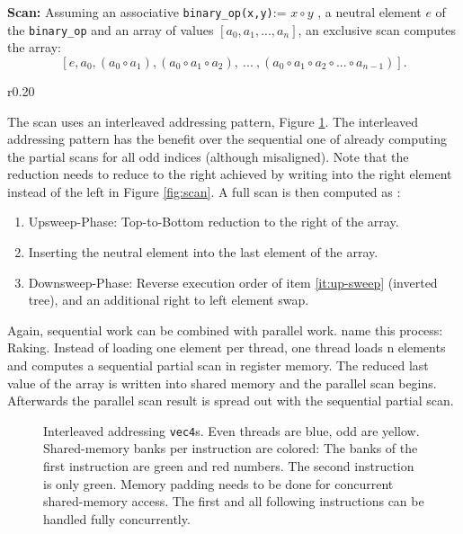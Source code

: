 \documentclass[m,times]{cgMA}
\begin{document}
\textbf{Scan:}  Assuming an associative \texttt{binary\_op(x,y)}:= $x \circ y$ , a neutral element $e$ of the \texttt{binary\_op} and an array of values $\left[a_0,a_1, ... ,a_n\right]$, an exclusive scan computes the array:
\begin{equation}
  \left[e , a_0 , \left(a_0 \circ a_1\right), \left(a_0 \circ a_1 \circ a_2\right), \ ... \ ,\left(a_0\circ a_1 \circ a_2 \circ ...\circ a_{n-1}\right)\right].
\end{equation}
\begin{wrapfigure}[13]{r}{0.20\textwidth}
\vspace{-11}
 
 \caption{Scan (add)}
  \label{fig:scan}
\end{wrapfigure}
The scan uses an interleaved addressing pattern, Figure \ref{fig:interleaved}. The interleaved addressing pattern has the benefit over the sequential one of already computing the partial scans for all odd indices (although misaligned). Note that the reduction needs to reduce to the right achieved by writing into the right element instead of the left in Figure \ref{fig:scan}. A full scan is then computed as \cite{NVIDIA:SCAN}:
\begin{enumerate}
  \item \label{it:up-sweep} Upsweep-Phase: Top-to-Bottom reduction to the right of the array.
  \item Inserting the neutral element into the last element of the array.
  \item Downsweep-Phase: Reverse execution order of item \ref{it:up-sweep} (inverted tree), and an additional right to left element swap.
\end{enumerate}
Again, sequential work can be combined with parallel work. \cite{NVIDIA:SCAN_MODERN} name this process: Raking. Instead of loading one element per thread, one thread loads n elements and computes a sequential partial scan in register memory. The reduced last value of the array is written into shared memory and the parallel scan begins. Afterwards the parallel scan result is spread out with the sequential partial scan.\cite{NVIDIA:SCAN_MODERN}
\begin{figure}[htbp]
  
  \caption{Interleaved addressing \texttt{vec4}s. Even threads are blue, odd are yellow. Shared-memory banks per instruction are colored: The banks of the first instruction are green and red numbers. The second instruction is only green. Memory padding needs to be done for concurrent shared-memory access. The first and all following instructions can be handled fully concurrently.}
\label{fig:interleaved}
\end{figure}
\end{document}
